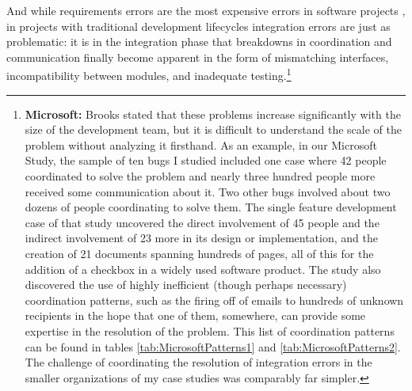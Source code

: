 And while requirements errors are the most expensive errors in software projects \cite{Boehm1981}, in projects with traditional development lifecycles integration errors are just as problematic: it is in the integration phase that breakdowns in coordination and communication finally become apparent in the form of mismatching interfaces, incompatibility between modules, and inadequate testing.\footnote{\textbf{Microsoft:} Brooks stated that these problems increase significantly with the size of the development team, but it is difficult to understand the scale of the problem without analyzing it firsthand. As an example, in our Microsoft Study, the sample of ten bugs I studied included one case where 42 people coordinated to solve the problem and nearly three hundred people more received some communication about it. Two other bugs involved about two dozens of people coordinating to solve them. The single feature development case of that study uncovered the direct involvement of 45 people and the indirect involvement of 23 more in its design or implementation, and the creation of 21 documents spanning hundreds of pages, all of this for the addition of a checkbox in a widely used software product. The study also discovered the use of highly inefficient (though perhaps necessary) coordination patterns, such as the firing off of emails to hundreds of unknown recipients in the hope that one of them, somewhere, can provide some expertise in the resolution of the problem. This list of coordination patterns can be found in tables \ref{tab:MicrosoftPatterns1} and \ref{tab:MicrosoftPatterns2}. The challenge of coordinating the resolution of integration errors in the smaller organizations of my case studies was comparably far simpler.}

